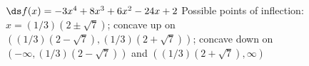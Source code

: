 {$\ds f(x) = -3 x^4+8 x^3+6 x^2-24 x+2$
}
{Possible points of inflection: $x=(1/3)(2\pm\sqrt{7})$;
concave up on $((1/3)(2-\sqrt{7}),(1/3)(2+\sqrt{7}))$;
concave down on $(-\infty,(1/3)(2-\sqrt{7}))$ and $((1/3)(2+\sqrt{7}),\infty)$
}

